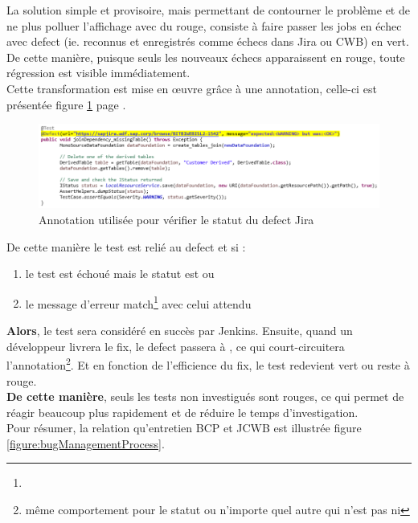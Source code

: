 La solution simple et provisoire, mais permettant de contourner le problème et de ne plus polluer l'affichage avec du rouge, consiste à faire passer les jobs en échec avec defect (ie. reconnus et enregistrés comme échecs dans Jira ou CWB) en vert.\\
De cette manière, puisque seuls les nouveaux échecs apparaissent en rouge, toute régression est visible immédiatement.\\
Cette transformation est mise en \oe{}uvre grâce à une annotation, celle-ci est présentée figure \ref{figure:annotationJava} page \pageref{figure:annotationJava}.\\


\begin{figure}[h]
  \centering
      \includegraphics[width=\textwidth]{images/annotationJava.png}
  \caption{Annotation utilisée pour vérifier le statut du defect Jira}
	\label{figure:annotationJava}
\end{figure}

De cette manière le test est relié au defect et si :
\begin{enumerate}
	\item le test est échoué mais le statut est  ou 
	\item le message d'erreur match\footnote{} avec celui attendu
\end{enumerate}
\textbf{Alors}, le test sera considéré en succès par Jenkins. Ensuite, quand un développeur livrera le fix, le defect passera à , ce qui court-circuitera l'annotation\footnote{même comportement pour le statut  ou n'importe quel autre qui n'est pas  ni }. Et en fonction de l'efficience du fix, le test redevient vert ou reste à rouge.\\
\textbf{De cette manière}, seuls les tests non investigués sont rouges, ce qui permet de réagir beaucoup plus rapidement et de réduire le temps d'investigation.\\

Pour résumer, la relation qu'entretien BCP et JCWB est illustrée figure \ref{figure:bugManagementProcess}.

